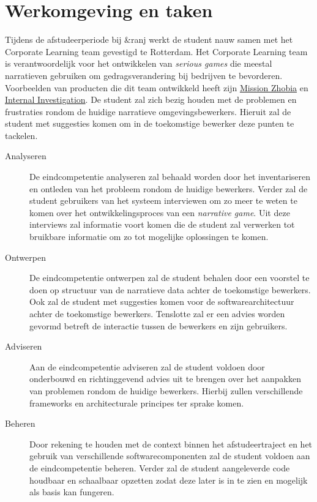 \documentclass{report}
\newcommand{\organisation}{\&ranj }
\begin{document}
\section{Werkomgeving en taken}
Tijdens de afstudeerperiode bij \organisation werkt de student nauw samen met het Corporate Learning team gevestigd te Rotterdam. Het Corporate Learning team is verantwoordelijk voor het ontwikkelen van \emph{serious games} die meestal narratieven gebruiken om gedragsverandering bij bedrijven te bevorderen. Voorbeelden van producten die dit team ontwikkeld heeft zijn \href{https://ranj.com/projects/corporate/development#mission-zhobia}{Mission Zhobia} en \href{https://ranj.nl/projects/corporate/development#internal-investigation-game}{Internal Investigation}. De student zal zich bezig houden met de problemen en frustraties rondom de huidige narratieve omgevingsbewerkers. Hieruit zal de student met suggesties komen om in de toekomstige bewerker deze punten te tackelen.
\begin{description}
\item[Analyseren] De eindcompetentie analyseren zal behaald worden door het inventariseren en ontleden van het probleem rondom de huidige bewerkers. Verder zal de student gebruikers van het systeem interviewen om zo meer te weten te komen over het ontwikkelingsproces van een \emph{narrative game}. Uit deze interviews zal informatie voort komen die de student zal verwerken tot bruikbare informatie om zo tot mogelijke oplossingen te komen.
\item[Ontwerpen] De eindcompetentie ontwerpen zal de student behalen door een voorstel te doen op structuur van de narratieve data achter de toekomstige bewerkers. Ook zal de student met suggesties komen voor de softwarearchitectuur achter de toekomstige bewerkers. Tenslotte zal er een advies worden gevormd betreft de interactie tussen de bewerkers en zijn gebruikers.
\item[Adviseren] Aan de eindcompetentie adviseren zal de student voldoen door onderbouwd en richtinggevend advies uit te brengen over het aanpakken van problemen rondom de huidige bewerkers. Hierbij zullen verschillende frameworks en architecturale principes ter sprake komen.
\item[Beheren] Door rekening te houden met de context binnen het afstudeertraject en het gebruik van verschillende softwarecomponenten zal de student voldoen aan de eindcompetentie beheren. Verder zal de student aangeleverde code houdbaar en schaalbaar opzetten zodat deze later is in te zien en mogelijk als basis kan fungeren.
\end{description}
\end{document}
